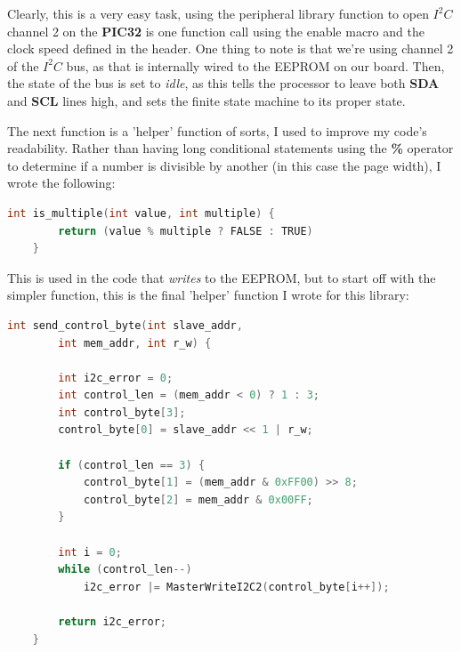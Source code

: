\documentclass[a4paper, 12pt]{article}
\begin{document}
Clearly, this is a very easy task, using the peripheral library function to open $I^2C$ channel 2 on the \textbf{PIC32} is one function call using the enable macro and the clock speed defined in the header. One thing to note is that we're using channel 2 of the $I^2C$ bus, as that is internally wired to the EEPROM on our board. Then, the state of the bus is set to \textit{idle}, as this tells the processor to leave both \textbf{SDA} and \textbf{SCL} lines high, and sets the finite state machine to its proper state.

The next function is a 'helper' function of sorts, I used to improve my code's readability. Rather than having long conditional statements using the \textbf{\%} operator to determine if a number is divisible by another (in this case the page width), I wrote the following:

	\begin{mdframed}[backgroundcolor=code-gray, roundcorner=10pt,
								innerleftmargin=5, innertopmargin=5, innerbottommargin=5]	
	\begin{lstlisting}[language=C, caption=Multiple-of Function, tabsize=2]
	int is_multiple(int value, int multiple) {
		return (value % multiple ? FALSE : TRUE)
	}
	\end{lstlisting}
	\end{mdframed}
	
This is used in the code that \textit{writes} to the EEPROM, but to start off with the simpler function, this is the final 'helper' function I wrote for this library:

	\begin{mdframed}[backgroundcolor=code-gray, roundcorner=10pt,
								innerleftmargin=5, innertopmargin=5, innerbottommargin=5]	
	\begin{lstlisting}[language=C, caption=Sending an Arbitrary Control Byte, tabsize=2]
	int send_control_byte(int slave_addr,
		int mem_addr, int r_w) {
		
		int i2c_error = 0;
		int control_len = (mem_addr < 0) ? 1 : 3;
		int control_byte[3];
		control_byte[0] = slave_addr << 1 | r_w;

		if (control_len == 3) { 
			control_byte[1] = (mem_addr & 0xFF00) >> 8;
			control_byte[2] = mem_addr & 0x00FF;
		}

		int i = 0;
		while (control_len--)
			i2c_error |= MasterWriteI2C2(control_byte[i++]);

		return i2c_error;
	}
	\end{lstlisting}
	\end{mdframed}
	
\end{document}
